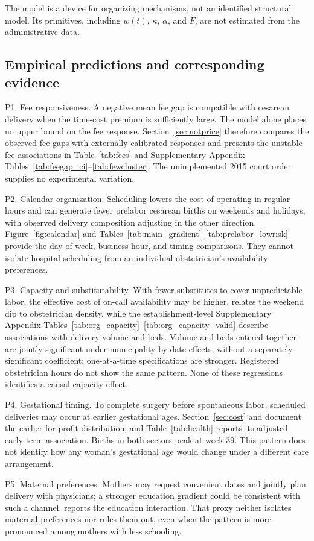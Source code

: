 The model is a device for organizing mechanisms, not an identified structural model. Its primitives, including $w(t)$, $\kappa$, $\alpha$, and $F$, are not estimated from the administrative data.

\subsection{Empirical predictions and corresponding evidence}

P1. Fee responsiveness. A negative mean fee gap is compatible with cesarean delivery when the time-cost premium is sufficiently large. The model alone places no upper bound on the fee response. Section~\ref{sec:notprice} therefore compares the observed fee gaps with externally calibrated responses and presents the unstable fee associations in Table~\ref{tab:fees} and Supplementary Appendix Tables~\ref{tab:feegap_ci}--\ref{tab:fewcluster}. The unimplemented 2015 court order supplies no experimental variation.

P2. Calendar organization. Scheduling lowers the cost of operating in regular hours and can generate fewer prelabor cesarean births on weekends and holidays, with observed delivery composition adjusting in the other direction. Figure~\ref{fig:calendar} and Tables~\ref{tab:main_gradient}--\ref{tab:prelabor_lowrisk} provide the day-of-week, business-hour, and timing comparisons. They cannot isolate hospital scheduling from an individual obstetrician's availability preferences.

P3. Capacity and substitutability. With fewer substitutes to cover unpredictable labor, the effective cost of on-call availability may be higher.  relates the weekend dip to obstetrician density, while the establishment-level Supplementary Appendix Tables~\ref{tab:org_capacity}--\ref{tab:org_capacity_valid} describe associations with delivery volume and beds. Volume and beds entered together are jointly significant under municipality-by-date effects, without a separately significant coefficient; one-at-a-time specifications are stronger. Registered obstetrician hours do not show the same pattern. None of these regressions identifies a causal capacity effect.

P4. Gestational timing. To complete surgery before spontaneous labor, scheduled deliveries may occur at earlier gestational ages. Section~\ref{sec:cost} and  document the earlier for-profit distribution, and Table~\ref{tab:health} reports its adjusted early-term association. Births in both sectors peak at week 39. This pattern does not identify how any woman's gestational age would change under a different care arrangement.

P5. Maternal preferences. Mothers may request convenient dates and jointly plan delivery with physicians; a stronger education gradient could be consistent with such a channel.  reports the education interaction. That proxy neither isolates maternal preferences nor rules them out, even when the pattern is more pronounced among mothers with less schooling.

